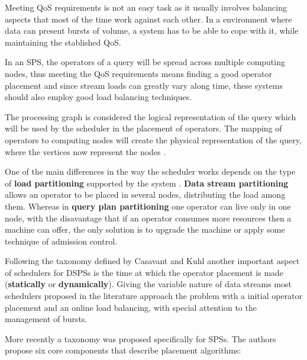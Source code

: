 \documentclass[ppgc,diss,english]{iiufrgs}
\begin{document}
Meeting QoS requirements is not an easy task as it usually involves balancing aspects that most of the time work against each other. In a environment where data can present bursts of volume, a system has to be able to cope with it, while maintaining the stablished QoS.

In an SPS, the operators of a query will be spread across multiple computing nodes, thus meeting the QoS requirements means finding a good operator placement and since stream loads can greatly vary along time, these systems should also employ good load balancing techniques.


The processing graph is considered the logical representation of the query which will be used by the scheduler in the placement of operators. The mapping of operators to computing nodes will create the physical representation of the query, where the vertices now represent the nodes \cite{kossmann2000state, lei2012robust}.

One of the main differences in the way the scheduler works depends on the type of \textbf{load partitioning} supported by the system \cite{johnson2008query}. \textbf{Data stream partitioning} allows an operator to be placed in several nodes, distributing the load among them. Whereas in \textbf{query plan partitioning} one operator can live only in one node, with the disavantage that if an operator consumes more resources then a machine can offer, the only solution is to upgrade the machine or apply some technique of admission control.

Following the taxonomy defined by Casavant and Kuhl \cite{casavant1988taxonomy} another important aspect of schedulers for DSPSs is the time at which the operator placement is made (\textbf{statically} or \textbf{dynamically}). Giving the variable nature of data streams most schedulers proposed in the literature approach the problem with a initial operator placement and an online load balancing, with special attention to the management of bursts.

More recently a taxonomy was proposed \cite{lakshmanan2008placement} specifically for SPSs. The authors propose six core components that describe placement algorithms:
\end{document}
